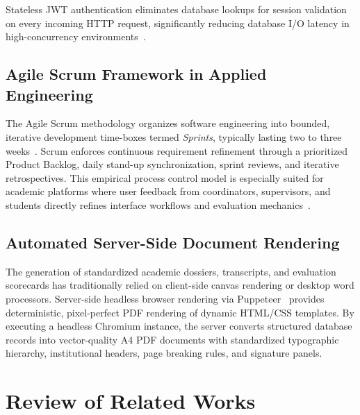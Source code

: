 Stateless JWT authentication eliminates database lookups for session validation on every incoming HTTP request, significantly reducing database I/O latency in high-concurrency environments~\citep{pressman2015software}.

\subsection{Agile Scrum Framework in Applied Engineering}
The Agile Scrum methodology organizes software engineering into bounded, iterative development time-boxes termed \textit{Sprints}, typically lasting two to three weeks~\citep{rubin2012scrum}. Scrum enforces continuous requirement refinement through a prioritized Product Backlog, daily stand-up synchronization, sprint reviews, and iterative retrospectives. This empirical process control model is especially suited for academic platforms where user feedback from coordinators, supervisors, and students directly refines interface workflows and evaluation mechanics~\citep{sommerville2016software}.

\subsection{Automated Server-Side Document Rendering}
The generation of standardized academic dossiers, transcripts, and evaluation scorecards has traditionally relied on client-side canvas rendering or desktop word processors. Server-side headless browser rendering via Puppeteer~\citep{puppeteer2024headless} provides deterministic, pixel-perfect PDF rendering of dynamic HTML/CSS templates. By executing a headless Chromium instance, the server converts structured database records into vector-quality A4 PDF documents with standardized typographic hierarchy, institutional headers, page breaking rules, and signature panels.

\section{Review of Related Works}

